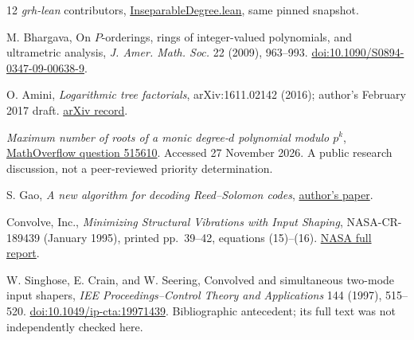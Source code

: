 \begin{thebibliography}{12}
\emph{grh-lean} contributors,
\href{https://github.com/VladimirReshetnikov/ProveIt/blob/2a9f8e3ee74a1824d57546f0b1b4f1cef5df93d6/Analysis/GeneralizedRiemannHypothesis/vendor/grh-lean/grh/src/Lib/CM/FormalGroup/InseparableDegree.lean}{InseparableDegree.lean},
same pinned snapshot.

M. Bhargava, On $P$-orderings, rings of integer-valued polynomials, and
ultrametric analysis, \emph{J. Amer. Math. Soc.} 22 (2009), 963--993.
\href{https://doi.org/10.1090/S0894-0347-09-00638-9}{doi:10.1090/S0894-0347-09-00638-9}.

O. Amini, \emph{Logarithmic tree factorials}, arXiv:1611.02142 (2016);
author's February 2017 draft.
\href{https://arxiv.org/abs/1611.02142}{arXiv record}.

\emph{Maximum number of roots of a monic degree-$d$ polynomial modulo $p^k$},
\href{https://mathoverflow.net/questions/515610/maximum-number-of-roots-of-a-monic-degree-d-polynomial-modulo-pk}{MathOverflow question 515610}.
Accessed 27 November 2026. A public research discussion, not a
peer-reviewed priority determination.

S. Gao, \emph{A new algorithm for decoding Reed--Solomon codes},
\href{https://www.math.clemson.edu/~sgao/papers/RS.pdf}{author's paper}.

Convolve, Inc., \emph{Minimizing Structural Vibrations with Input Shaping},
NASA-CR-189439 (January 1995), printed pp.\ 39--42, equations (15)--(16).
\href{https://ntrs.nasa.gov/api/citations/19950024365/downloads/19950024365.pdf}{NASA full report}.

W. Singhose, E. Crain, and W. Seering,
Convolved and simultaneous two-mode input shapers,
\emph{IEE Proceedings--Control Theory and Applications} 144 (1997), 515--520.
\href{https://doi.org/10.1049/ip-cta:19971439}{doi:10.1049/ip-cta:19971439}.
Bibliographic antecedent; its full text was not independently checked here.
\end{thebibliography}
